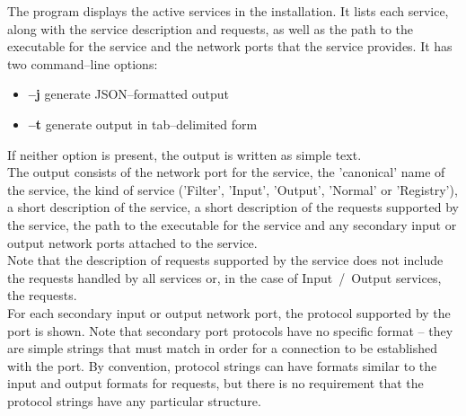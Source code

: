 The program  displays the active services in the \mplusm{}
installation.
It lists each service, along with the service description and requests, as well as the
path to the executable for the service and the \yarp{} network ports that the service
provides.
It has two command--line options:
\begin{itemize}
\item \textbf{--j} generate JSON--formatted output
\item \textbf{--t} generate output in tab--delimited form
\end{itemize}
If neither option is present, the output is written as simple text.\\

The output consists of the \yarp{} network port for the service, the 'canonical' name of
the service, the kind of service ('Filter', 'Input', 'Output', 'Normal' or 'Registry'), a
short description of the service, a short description of the requests supported by the
service, the path to the executable for the service and any secondary input or output
\yarp{} network ports attached to the service.\\

Note that the description of requests supported by the service does not include the
 requests handled by all services or, in the case of
Input~/~Output services, the 
requests.\\

For each secondary input or output \yarp{} network port, the protocol supported by the
port is shown.
Note that secondary port protocols have no specific format -- they are simple strings that
must match in order for a connection to be established with the port.
By convention, protocol strings can have formats similar to the input and output formats
for requests, but there is no requirement that the protocol strings have any particular
structure.\\

